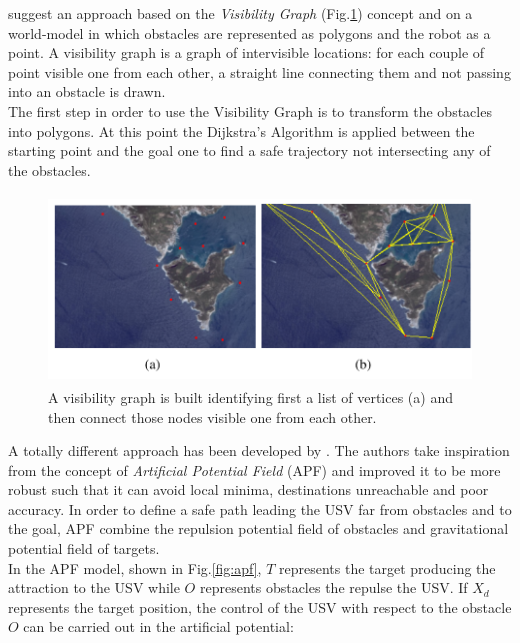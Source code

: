 \documentclass[12pt]{article}
\begin{document}
              \indent \textcite{Casalino2009} suggest an approach based on the \textit{Visibility Graph} (Fig.\ref{fig:visibility}) concept and on a world-model in which obstacles are represented as polygons and the robot as a point. A visibility graph is a graph of intervisible locations: for each couple of point visible one from each other, a straight line connecting them and not passing into an obstacle is drawn.\\
              The first step in order to use the Visibility Graph is to transform the obstacles into polygons. At this point the Dijkstra's Algorithm \parencite{EWD:NumerMath59} is applied between the starting point and the goal one to find a safe trajectory not intersecting any of the obstacles.


              \begin{figure}
                    \centering
                    \includegraphics[height=5cm]{./Images/Casalino/visibility_graph}
                    \caption{A visibility graph is built identifying first a list of vertices (a) and then connect those nodes visible one from each other.}
                    \label{fig:visibility}
              \end{figure}

              A totally different approach has been developed by \textcite{Xie2014}. The authors take inspiration from the concept of \textit{Artificial Potential Field} (APF) \parencite{Khatib1985} and improved it to be more robust such that it can avoid local minima, destinations unreachable and poor accuracy. In order to define a safe path leading the USV far from obstacles and to the goal, APF combine the repulsion potential field of obstacles and gravitational potential field of targets. \\
              In the APF model, shown in Fig.\ref{fig:apf}, $T$ represents the target producing the attraction to the USV while $O$ represents obstacles the repulse the USV. If $X_d$ represents the target position, the control of the USV with respect to the obstacle $O$ can be carried out in the artificial potential:
\end{document}
